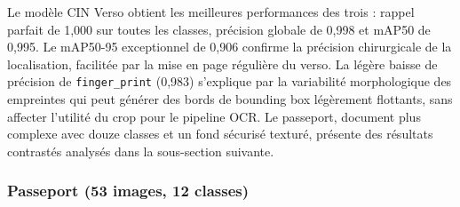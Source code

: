 \noindent Le modèle CIN Verso obtient les meilleures performances des trois : rappel parfait de 1,000 sur toutes les classes, précision globale de 0,998 et mAP50 de 0,995. Le mAP50-95 exceptionnel de 0,906 confirme la précision chirurgicale de la localisation, facilitée par la mise en page régulière du verso. La légère baisse de précision de \texttt{finger\_print} (0,983) s'explique par la variabilité morphologique des empreintes qui peut générer des bords de bounding box légèrement flottants, sans affecter l'utilité du crop pour le pipeline OCR. Le passeport, document plus complexe avec douze classes et un fond sécurisé texturé, présente des résultats contrastés analysés dans la sous-section suivante.

\subsubsection{Passeport (53 images, 12 classes)}

